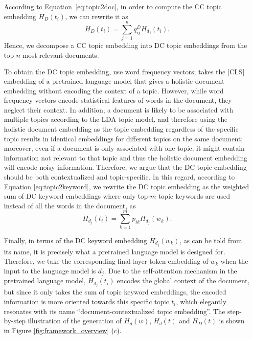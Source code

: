\documentclass[11pt]{article}
\begin{document}
According to Equation~\ref{eq:topic2doc}, in order to compute the CC topic embedding $H_{D}(t_i)$, we can rewrite it as 
\begin{equation}
H_{D}(t_i) = \sum_{j=1}^{n} q_{ij}^D H_{d_j}(t_i).
\end{equation}
Hence, we decompose a CC topic embedding into DC topic embeddings from the top-$n$ most relevant documents.

To obtain the DC topic embedding, \citet{demszky2019analyzing} use word frequency vectors; \citet{grootendorst2020bertopic} takes the [CLS] embedding of a pretrained language model that gives a holistic document embedding without encoding the context of a topic.
However, while word frequency vectors encode statistical features of words in the document, they neglect their context. In addition, a document is likely to be associated with multiple topics according to the LDA topic model, and therefore using the holistic document embedding as the topic embedding regardless of the specific topic results in identical embeddings for different topics on the same document; moreover, even if a document is only associated with one topic, it might contain information not relevant to that topic and thus the holistic document embedding will encode noisy information. Therefore, we argue that the DC topic embedding should be both contextualized and topic-specific. In this regard, according to Equation \ref{eq:topic2keyword}, we rewrite the DC topic embedding as the weighted sum of DC keyword embeddings where only top-$m$ topic keywords are used instead of all the words in the document, as
\begin{equation}
\label{eq:topic2token}
    H_{d_j}(t_i) = \sum_{k=1}^{m} p_{ik}H_{d_j}(w_k).
\end{equation}

Finally, in terms of the DC keyword embedding $H_{d_j}(w_k)$, as can be told from its name, it is precisely what a pretrained language model \cite{devlin2018bert} is designed for. Therefore, we take the corresponding final-layer token embedding of $w_k$ when the input to the language model is $d_j$. Due to the self-attention mechanism \cite{vaswani2017attention} in the pretrained language model, $H_{d_j}(t_i)$ encodes the global context of the document, but since it only takes the sum of topic keyword embeddings, the encoded information is more oriented towards this specific topic $t_i$, which elegantly resonates with its name ``document-contextualized topic embedding''.
The step-by-step illustration of the generation of $H_d(w)$, $H_d(t)$ and $H_D(t)$ is shown in Figure \ref{fig:framework_overview} (c).
\end{document}

